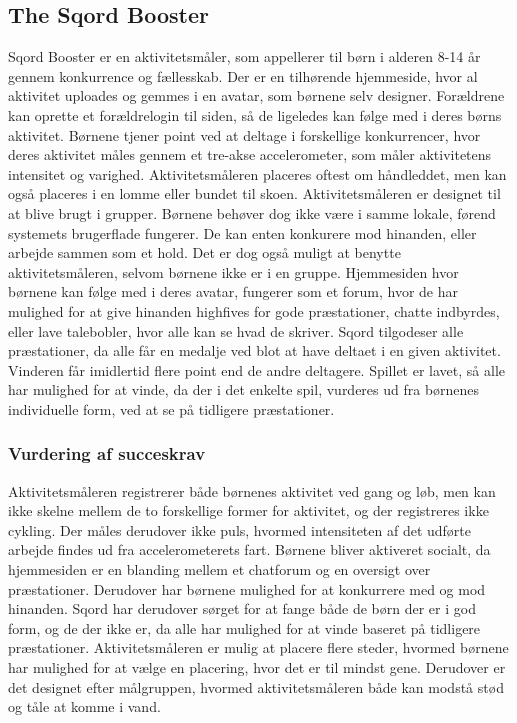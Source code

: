 \subsection{The Sqord Booster}
Sqord Booster er en aktivitetsmåler, som appellerer til børn i alderen 8-14 år gennem konkurrence og fællesskab. Der er en tilhørende hjemmeside, hvor al aktivitet uploades og gemmes i en avatar, som børnene selv designer. Forældrene kan oprette et forældrelogin til siden, så de ligeledes kan følge med i deres børns aktivitet. Børnene tjener point ved at deltage i forskellige konkurrencer, hvor deres aktivitet måles gennem et tre-akse accelerometer, som måler aktivitetens intensitet og varighed. Aktivitetsmåleren placeres oftest om håndleddet, men kan også placeres i en lomme eller bundet til skoen. \citep{Sqord_family2015} \newline
Aktivitetsmåleren er designet til at blive brugt i grupper. Børnene behøver dog ikke være i samme lokale, førend systemets brugerflade fungerer. De kan enten konkurere mod hinanden, eller arbejde sammen som et hold. Det er dog også muligt at benytte aktivitetsmåleren, selvom børnene ikke er i en gruppe. \citep{Sqord_family2015,Sqord_group2015} \newline
Hjemmesiden hvor børnene kan følge med i deres avatar, fungerer som et forum, hvor de har mulighed for at give hinanden highfives for gode præstationer, chatte indbyrdes, eller lave talebobler, hvor alle kan se hvad de skriver. \citep{Sqord_family2015} \newline
Sqord tilgodeser alle præstationer, da alle får en medalje ved blot at have deltaet i en given aktivitet. Vinderen får imidlertid flere point end de andre deltagere. Spillet er lavet, så alle har mulighed for at vinde, da der i det enkelte spil, vurderes ud fra børnenes individuelle form, ved at se på tidligere præstationer. \citep{Sqord_family2015}

\subsubsection{Vurdering af succeskrav}
Aktivitetsmåleren registrerer både børnenes aktivitet ved gang og løb, men kan ikke skelne mellem de to forskellige former for aktivitet, og der registreres ikke cykling. Der måles derudover ikke puls, hvormed intensiteten af det udførte arbejde findes ud fra accelerometerets fart. \newline
Børnene bliver aktiveret socialt, da hjemmesiden er en blanding mellem et chatforum og en oversigt over præstationer. Derudover har børnene mulighed for at konkurrere med og mod hinanden. Sqord har derudover sørget for at fange både de børn der er i god form, og de der ikke er, da alle har mulighed for at vinde baseret på tidligere præstationer. Aktivitetsmåleren er mulig at placere flere steder, hvormed børnene har mulighed for at vælge en placering, hvor det er til mindst gene. Derudover er det designet efter målgruppen, hvormed aktivitetsmåleren både kan modstå stød og tåle at komme i vand.  

